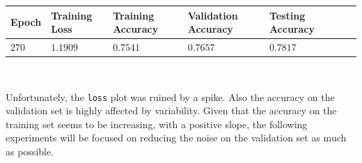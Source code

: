 \documentclass[11pt,a4paper]{article}
\begin{document}
\begin{figure}[H]
\end{figure}
\begin{center}
\hspace*{-0.8cm}
\begin{tabular}{|p{1.2cm}|p{1.8cm}|p{2cm}|p{2cm}|p{2cm}|p{2cm}|p{2cm}|}
\rowcolor{gray!50}
\hline
\textbf{Epoch} & \textbf{Training Loss} & \textbf{Training Accuracy} & \textbf{Validation Accuracy} & \textbf{Testing Accuracy}\\
\hline
$270$ & $1.1909$ & $0.7541$ & $0.7657$ & $0.7817$\\
\hline
\end{tabular}\\
\end{center}
Unfortunately, the \texttt{loss} plot was ruined by a spike. Also the accuracy on the validation set is highly affected by variability. Given that the accuracy on the training set seems to be increasing, with a positive slope, the following experiments will be focused on reducing the noise on the validation set as much as possible.
\end{document}
